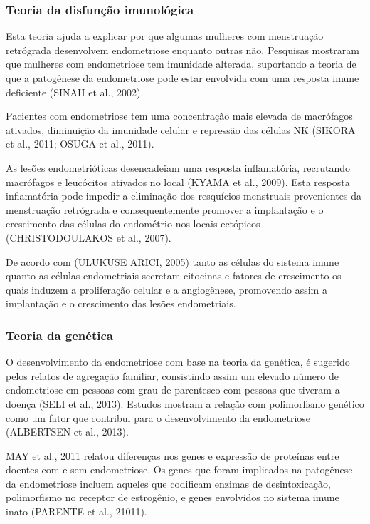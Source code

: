 \documentclass[12pt]{article} %
\begin{document}
\subsubsection{Teoria da disfunção imunológica}

Esta teoria ajuda a explicar por que algumas mulheres com menstruação
retrógrada desenvolvem endometriose enquanto outras não. Pesquisas
mostraram que mulheres com endometriose tem imunidade alterada,
suportando a teoria de que a patogênese da endometriose pode estar
envolvida com uma resposta imune deficiente (SINAII et al., 2002).

Pacientes com endometriose tem uma concentração mais elevada de
macrófagos ativados, diminuição da imunidade celular e repressão das
células NK (SIKORA et al., 2011; OSUGA et al., 2011).

As lesões endometrióticas desencadeiam uma resposta inflamatória,
recrutando macrófagos e leucócitos ativados no local (KYAMA et al.,
2009). Esta resposta inflamatória pode impedir a eliminação dos
resquícios menstruais provenientes da menstruação retrógrada e
consequentemente promover a implantação e o crescimento das células do
endométrio nos locais ectópicos (CHRISTODOULAKOS et al., 2007).

De acordo com (ULUKUSE ARICI, 2005) tanto as células do sistema imune
quanto as células endometriais secretam citocinas e fatores de
crescimento os quais induzem a proliferação celular e a angiogênese,
promovendo assim a implantação e o crescimento das lesões
endometriais.

\subsubsection{Teoria da genética}

O desenvolvimento da endometriose com base na teoria da genética, é sugerido pelos relatos de agregação familiar, consistindo assim um elevado número de endometriose em pessoas com grau de parentesco com pessoas que tiveram a doença (SELI et al., 2013).
Estudos mostram a relação com polimorfismo genético como um fator que contribui para o desenvolvimento da endometriose (ALBERTSEN et al., 2013).

MAY et al., 2011 relatou  diferenças nos genes e expressão de proteínas entre doentes com e sem endometriose. Os genes que foram implicados na patogênese da endometriose incluem aqueles que codificam enzimas de desintoxicação, polimorfismo no receptor de estrogênio, e genes envolvidos no sistema imune inato (PARENTE et al., 21011). 
\end{document}
